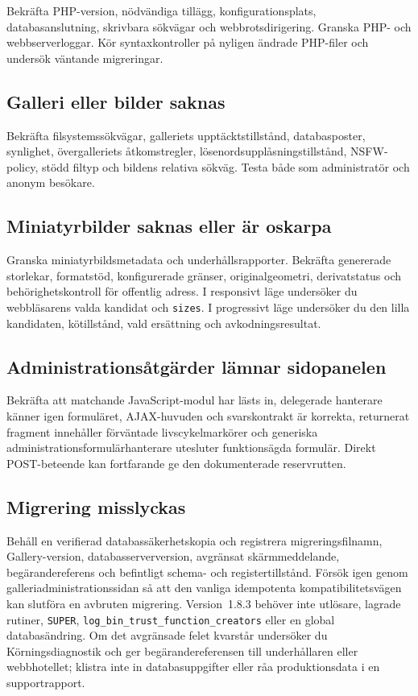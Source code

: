 \documentclass[11pt,a4paper]{article}
\newcommand{\version}{1.8.3}
\newcommand{\codeword}[1]{\nolinkurl{#1}}
\begin{document}
Bekräfta PHP-version, nödvändiga tillägg, konfigurationsplats,
databasanslutning, skrivbara sökvägar och webbrotsdirigering. Granska PHP- och
webbserverloggar. Kör syntaxkontroller på nyligen ändrade PHP-filer och undersök
väntande migreringar.

\subsection{Galleri eller bilder saknas}

Bekräfta filsystemssökvägar, galleriets upptäcktstillstånd, databasposter,
synlighet, övergalleriets åtkomstregler, lösenordsupplåsningstillstånd,
NSFW-policy, stödd filtyp och bildens relativa sökväg. Testa både som
administratör och anonym besökare.

\subsection{Miniatyrbilder saknas eller är oskarpa}

Granska miniatyrbildsmetadata och underhållsrapporter. Bekräfta genererade
storlekar, formatstöd, konfigurerade gränser, originalgeometri, derivatstatus
och behörighetskontroll för offentlig adress. I responsivt läge undersöker du
webbläsarens valda kandidat och \codeword{sizes}. I progressivt läge undersöker
du den lilla kandidaten, kötillstånd, vald ersättning och avkodningsresultat.

\subsection{Administrationsåtgärder lämnar sidopanelen}

Bekräfta att matchande JavaScript-modul har lästs in, delegerade hanterare
känner igen formuläret, AJAX-huvuden och svarskontrakt är korrekta, returnerat
fragment innehåller förväntade livscykelmarkörer och generiska
administrationsformulärhanterare utesluter funktionsägda formulär. Direkt
POST-beteende kan fortfarande ge den dokumenterade reservrutten.

\subsection{Migrering misslyckas}

Behåll en verifierad databassäkerhetskopia och registrera migreringsfilnamn,
Gallery-version, databasserverversion, avgränsat skärmmeddelande,
begärandereferens och befintligt schema- och registertillstånd. Försök igen
genom galleriadministrationssidan så att den vanliga idempotenta
kompatibilitetsvägen kan slutföra en avbruten migrering. Version~\version{}
behöver inte utlösare, lagrade rutiner, \codeword{SUPER},
\codeword{log\_bin\_trust\_function\_creators} eller en global databasändring.
Om det avgränsade felet kvarstår undersöker du Körningsdiagnostik och ger
begärandereferensen till underhållaren eller webbhotellet; klistra inte in
databasuppgifter eller råa produktionsdata i en supportrapport.
\end{document}
